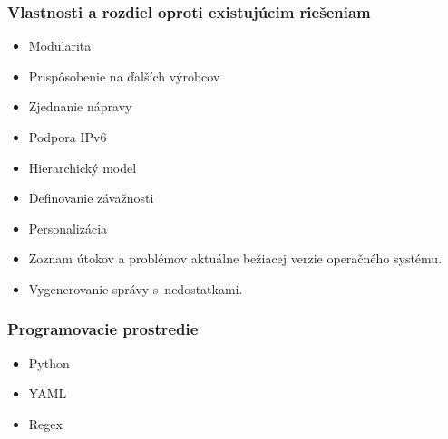 \documentclass[%
  12pt,       				%
	t,                  %
	aspectratio=1610,   %
	unicode,						%
]{beamer}				    	%
\begin{document}
\begin{frame} 
	\frametitle{Vlastnosti a rozdiel oproti existujúcim riešeniam}
	
	\begin{itemize}
		\item Modularita
		\vspace{0.5em}
		\item Prispôsobenie na ďalších výrobcov
		\vspace{0.5em}
		\item Zjednanie nápravy
		\vspace{0.5em}
		\item Podpora IPv6
		\vspace{0.5em}
		\item Hierarchický model
		\vspace{0.5em}
		\item Definovanie závažnosti
		\vspace{0.5em}
		\item Personalizácia
		\vspace{0.5em}
		\item Zoznam útokov a problémov aktuálne bežiacej verzie operačného systému.
		\vspace{0.5em}
		\item Vygenerovanie správy s~nedostatkami.
	\end{itemize}
	
\end{frame}


\begin{frame} 
\frametitle{Programovacie prostredie}
	\begin{itemize}
		\vspace{2em}
		\item Python \vspace{2em}
		\item YAML \vspace{2em}
		\item Regex
	\end{itemize}
\end{frame}
\end{document}
